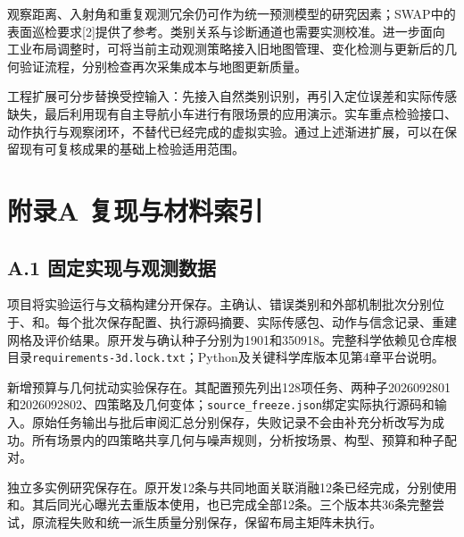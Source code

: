 \documentclass[11pt,a4paper]{article}
\numberwithin{equation}{section}
\begin{document}
观察距离、入射角和重复观测冗余仍可作为统一预测模型的研究因素；SWAP中的表面巡检要求{[}2{]}提供了参考。类别关系与诊断通道也需要实测校准。进一步面向工业布局调整时，可将当前主动观测策略接入旧地图管理、变化检测与更新后的几何验证流程，分别检查再次采集成本与地图更新质量。

工程扩展可分步替换受控输入：先接入自然类别识别，再引入定位误差和实际传感缺失，最后利用现有自主导航小车进行有限场景的应用演示。实车重点检验接口、动作执行与观察闭环，不替代已经完成的虚拟实验。通过上述渐进扩展，可以在保留现有可复核成果的基础上检验适用范围。

\hypertarget{ux9644ux5f55a-ux590dux73b0ux4e0eux6750ux6599ux7d22ux5f15}{%
\clearpage
\section*{附录A 复现与材料索引}
\label{ux9644ux5f55a-ux590dux73b0ux4e0eux6750ux6599ux7d22ux5f15}}

\hypertarget{a.1-ux56faux5b9aux5b9eux73b0ux4e0eux89c2ux6d4bux6570ux636e}{%
\subsection*{A.1 固定实现与观测数据}\label{a.1-ux56faux5b9aux5b9eux73b0ux4e0eux89c2ux6d4bux6570ux636e}}

项目将实验运行与文稿构建分开保存。主确认、错误类别和外部机制批次分别位于、和。每个批次保存配置、执行源码摘要、实际传感包、动作与信念记录、重建网格及评价结果。原开发与确认种子分别为1901和350918。完整科学依赖见仓库根目录\texttt{requirements-3d.lock.txt}；Python及关键科学库版本见第4章平台说明。

新增预算与几何扰动实验保存在。其配置预先列出128项任务、两种子2026092801和2026092802、四策略及几何变体；\texttt{source\_freeze.json}绑定实际执行源码和输入。原始任务输出与批后审阅汇总分别保存，失败记录不会由补充分析改写为成功。所有场景内的四策略共享几何与噪声规则，分析按场景、构型、预算和种子配对。

独立多实例研究保存在。原开发12条与共同地面关联消融12条已经完成，分别使用和。其后同光心曝光去重版本使用，也已完成全部12条。三个版本共36条完整尝试，原流程失败和统一派生质量分别保存，保留布局主矩阵未执行。
\end{document}
